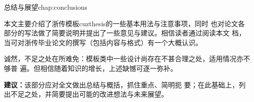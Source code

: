 \begin{cuzchapter}{总结与展望}{chap:conclusions}

	本文主要介绍了浙传模板cuzthesis的一些基本用法与注意事项，同时
	也对论文各部分的写法做了简要说明并提出了一些意见与建议。相信读者通过阅读本文
	档，当可对浙传毕业论文的撰写（包括内容与格式）有一个大概认识。

	诚然，不足之处在所难免：模板类中一些设计尚存在不甚合理之处，适用情况亦不够普
	遍。但相信随着知识的增长，上述缺憾可逐一弥补。

	\begin{leftbar}
		\noindent\textbf{建议：}该部分应对全文做出总结与概括，抓住重点、简明扼
		要；在此基础上，列出不足之处，并简要提出可能的改进想法与未来展望。
	\end{leftbar}

\end{cuzchapter}